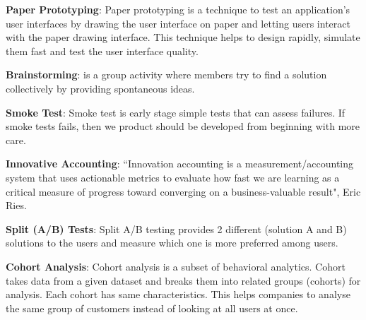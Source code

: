 \textbf{Paper Prototyping}: Paper prototyping is a technique to test an application's user interfaces by drawing the user interface on paper and letting users interact with the paper drawing interface. This technique helps to design rapidly, simulate them fast and test the user interface quality. \citep{paperprototyping}

\textbf{Brainstorming}: is a group activity where members try to find a solution collectively by providing spontaneous ideas.

\textbf{Smoke Test}: Smoke test is early stage simple tests that can assess failures. If smoke tests fails, then we product should be developed from beginning with more care. 

\textbf{Innovative Accounting}: ``Innovation accounting is a measurement/accounting system that uses actionable metrics to evaluate how fast we are learning as a critical measure of progress toward converging on a business-valuable result", Eric Ries. \citep{leanstartup}

\textbf{Split (A/B) Tests}: Split A/B testing provides 2 different (solution A and B) solutions  to the users and measure which one is more preferred among users.

\textbf{Cohort Analysis}: Cohort analysis is a subset of behavioral analytics. Cohort takes data from a given dataset and breaks them into related groups (cohorts) for analysis. Each cohort has same characteristics. This helps companies to analyse the same group of customers instead of looking at all users at once. 

